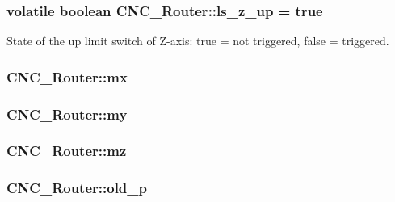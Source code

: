 \hypertarget{class_c_n_c___router_a1f573ec5b6c857e5aee5cebb7ad9c158}{
\subsubsection[{ls\+\_\+z\+\_\+up}]{\setlength{\rightskip}{0pt plus 5cm}volatile boolean C\+N\+C\+\_\+\+Router\+::ls\+\_\+z\+\_\+up = true\hspace{0.3cm}{\ttfamily [static]}}}\label{class_c_n_c___router_a1f573ec5b6c857e5aee5cebb7ad9c158}


State of the up limit switch of Z-\/axis\+: true = not triggered, false = triggered. 

\hypertarget{class_c_n_c___router_aa6009653314607491aa277b1f3c9bf85}{
\subsubsection[{mx}]{ C\+N\+C\+\_\+\+Router\+::mx\hspace{0.3cm}{\ttfamily [private]}}}\label{class_c_n_c___router_aa6009653314607491aa277b1f3c9bf85}
\hypertarget{class_c_n_c___router_ac3fb4521615d90ff7baa6bdb287d97c9}{
\subsubsection[{my}]{ C\+N\+C\+\_\+\+Router\+::my\hspace{0.3cm}{\ttfamily [private]}}}\label{class_c_n_c___router_ac3fb4521615d90ff7baa6bdb287d97c9}
\hypertarget{class_c_n_c___router_add549ccc206f5feff41f9e818e370ef8}{
\subsubsection[{mz}]{ C\+N\+C\+\_\+\+Router\+::mz\hspace{0.3cm}{\ttfamily [private]}}}\label{class_c_n_c___router_add549ccc206f5feff41f9e818e370ef8}
\hypertarget{class_c_n_c___router_afd338336ec37545574369a5f71ff310b}{
\subsubsection[{old\+\_\+p}]{ C\+N\+C\+\_\+\+Router\+::old\+\_\+p\hspace{0.3cm}{\ttfamily [private]}}}\label{class_c_n_c___router_afd338336ec37545574369a5f71ff310b}


